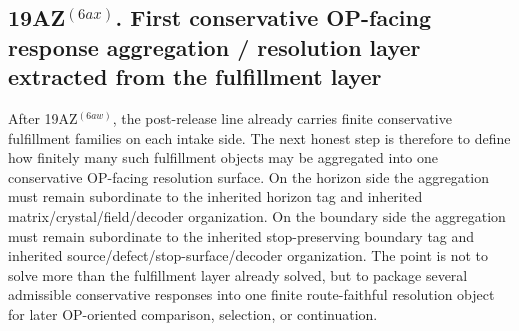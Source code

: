 \subsection*{19AZ$^{(6ax)}$. First conservative OP-facing response aggregation / resolution layer extracted from the fulfillment layer}
\label{sec:first-conservative-op-facing-response-aggregation-resolution-layer-extracted-from-the-fulfillment-layer}
After 19AZ$^{(6aw)}$, the post-release line already carries finite conservative fulfillment families on each intake side. The next honest step is therefore to define how finitely many such fulfillment objects may be aggregated into one conservative OP-facing resolution surface. On the horizon side the aggregation must remain subordinate to the inherited horizon tag and inherited matrix/crystal/field/decoder organization. On the boundary side the aggregation must remain subordinate to the inherited stop-preserving boundary tag and inherited source/defect/stop-surface/decoder organization. The point is not to solve more than the fulfillment layer already solved, but to package several admissible conservative responses into one finite route-faithful resolution object for later OP-oriented comparison, selection, or continuation.

